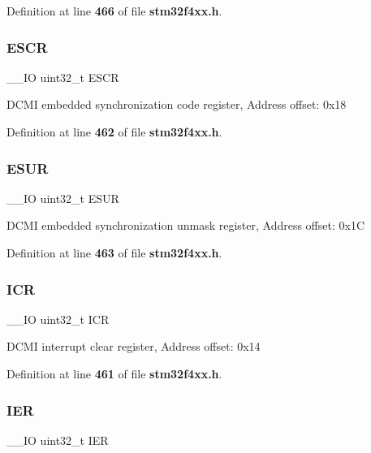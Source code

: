 Definition at line \textbf{ 466} of file \textbf{ stm32f4xx.\+h}.

\mbox{\label{structDCMI__TypeDef_a9cc4ec74be864c929261e0810f2fd7f0}} 
\subsubsection{E\+S\+CR}
{\footnotesize\ttfamily \+\_\+\+\_\+\+IO uint32\+\_\+t E\+S\+CR}

D\+C\+MI embedded synchronization code register, Address offset\+: 0x18 

Definition at line \textbf{ 462} of file \textbf{ stm32f4xx.\+h}.

\mbox{\label{structDCMI__TypeDef_af751d49ef824c1636c78822ecae066f4}} 
\subsubsection{E\+S\+UR}
{\footnotesize\ttfamily \+\_\+\+\_\+\+IO uint32\+\_\+t E\+S\+UR}

D\+C\+MI embedded synchronization unmask register, Address offset\+: 0x1C 

Definition at line \textbf{ 463} of file \textbf{ stm32f4xx.\+h}.

\mbox{\label{structDCMI__TypeDef_a0a8c8230846fd8ff154b9fde8dfa0399}} 
\subsubsection{I\+CR}
{\footnotesize\ttfamily \+\_\+\+\_\+\+IO uint32\+\_\+t I\+CR}

D\+C\+MI interrupt clear register, Address offset\+: 0x14 

Definition at line \textbf{ 461} of file \textbf{ stm32f4xx.\+h}.

\mbox{\label{structDCMI__TypeDef_a6566f8cfbd1d8aa7e8db046aa35e77db}} 
\subsubsection{I\+ER}
{\footnotesize\ttfamily \+\_\+\+\_\+\+IO uint32\+\_\+t I\+ER}

